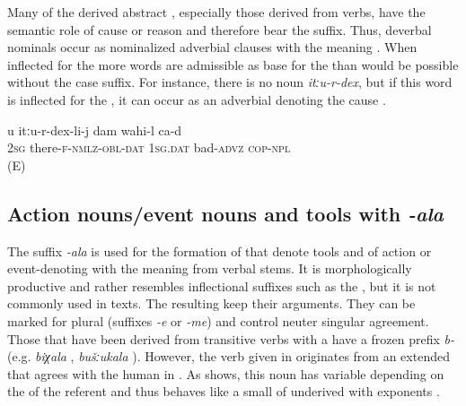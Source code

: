 Many of the derived abstract , especially those derived from verbs, have the semantic role of cause or reason and therefore bear the  suffix. Thus, deverbal nominals occur as nominalized adverbial clauses with the meaning . When inflected for the  more words are admissible as base for the  than would be possible without the case suffix. For instance, there is no noun \textit{itːu-r-dex}, but if this word is inflected for the , it can occur as an adverbial denoting the cause .
%
\begin{exe}
	\ex	\label{Because you are there I feel bad}
	\gll	u itːu-r-dex-li-j dam wahi-l ca-d \\
		2\textsc{sg}	there-\textsc{f-nmlz-obl}-\textsc{dat}	1\textsc{sg}.\textsc{dat}	bad-\textsc{advz} \textsc{cop-npl}\\
	\glt	{} (E)
\end{exe}



\subsection{Action nouns\slash event nouns and tools with \textit{-ala}}
\label{ssec:Action and event nouns way of V-ing with -ala}

The suffix \textit{-ala} is used for the formation of  that denote tools and of action or event-denoting  with the meaning  from verbal stems. It is morphologically productive and rather resembles inflectional suffixes such as the , but it is not commonly used in texts. The resulting  keep their arguments. They can be marked for plural (suffixes \textit{-e} or \textit{-me}) and control neuter singular agreement. Those  that have been derived from transitive verbs with a   have a frozen  prefix \textit{b-} (e.g. \textit{biχala} , \textit{bušːukala} ). However, the verb given in  originates from an extended  that agrees with the human  in . As  shows, this noun has variable  depending on the  of the referent and thus behaves like a small  of underived   with  exponents .
%



